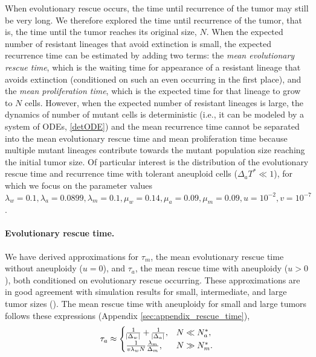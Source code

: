 \documentclass[12pt]{extarticle}
\begin{document}
When evolutionary rescue occurs, the time until recurrence of the tumor may still be very long. We therefore explored the time until recurrence of the tumor, that is, the time until the tumor reaches its original size, $N$.
When the expected number of resistant lineages that avoid extinction is small, the expected recurrence time can be estimated by adding two terms: the \emph{mean evolutionary rescue time}, which is the waiting time for appearance of a resistant lineage that avoids extinction (conditioned on such an even occurring in the first place), and the \emph{mean proliferation time}, which is the expected time for that lineage to grow to $N$ cells.
However, when the expected number of resistant lineages is large, the dynamics of number of mutant cells is deterministic (i.e., it can be modeled by a system of ODEs, \cref{detODE}) and the mean recurrence time cannot be separated into the mean evolutionary rescue time and mean proliferation time because multiple mutant lineages contribute towards the mutant population size reaching the initial tumor size. %
Of particular interest is the distribution of the evolutionary rescue time and recurrence time with tolerant aneuploid cells ($\Delta_a T^*\ll1$), for which we focus on the parameter values  $\lambda_w=0.1, \lambda_a=0.0899,\lambda_m=0.1,\mu_w=0.14,\mu_a=0.09,\mu_m=0.09, u=10^{-2}, v=10^{-7}$ .

\paragraph{Evolutionary rescue time.}
We have derived approximations for $\tau_m$, the mean evolutionary rescue time without aneuploidy ($u=0$), and $\tau_a$, the mean rescue time with aneuploidy ($u>0$), both conditioned on evolutionary rescue occurring.
These approximations are in good agreement with simulation results for small, intermediate, and large tumor sizes ().
The mean rescue time with aneuploidy for small and large tumors follows these expressions (Appendix \ref{sec:appendix_rescue_time}),
\begin{equation}  \label{eq:AsymptoticTimeRules}
\tau_a \approx \begin{cases}
    \frac{1}{\abs{\Delta_w}}+\frac{1}{\abs{\Delta_a}} ,&
 N \ll N_a^* ,\\ 
  \frac{1}{v\lambda_w N}   \frac{\lambda_m}{\Delta_m} ,& %
  N \gg N_m^* .
  \end{cases}
\end{equation}
\end{document}
